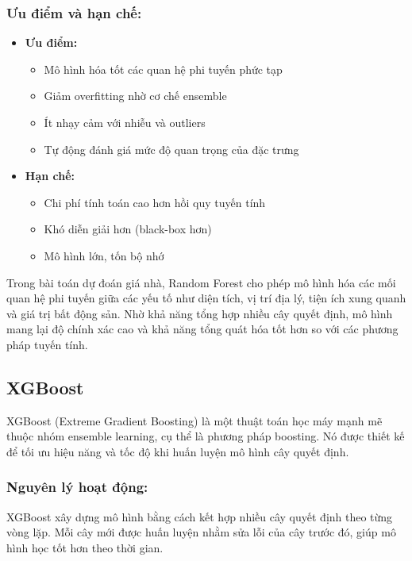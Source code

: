 \subsubsection*{Ưu điểm và hạn chế:}

\begin{itemize}
    \item \textbf{Ưu điểm:}
    \begin{itemize}
        \item Mô hình hóa tốt các quan hệ phi tuyến phức tạp
        \item Giảm overfitting nhờ cơ chế ensemble
        \item Ít nhạy cảm với nhiễu và outliers
        \item Tự động đánh giá mức độ quan trọng của đặc trưng
    \end{itemize}
    
    \item \textbf{Hạn chế:}
    \begin{itemize}
        \item Chi phí tính toán cao hơn hồi quy tuyến tính
        \item Khó diễn giải hơn (black-box hơn)
        \item Mô hình lớn, tốn bộ nhớ
    \end{itemize}
\end{itemize}

Trong bài toán dự đoán giá nhà, Random Forest cho phép mô hình hóa các mối quan hệ phi tuyến giữa các yếu tố như diện tích, vị trí địa lý, tiện ích xung quanh và giá trị bất động sản. Nhờ khả năng tổng hợp nhiều cây quyết định, mô hình mang lại độ chính xác cao và khả năng tổng quát hóa tốt hơn so với các phương pháp tuyến tính.


\subsection{XGBoost}
XGBoost (Extreme Gradient Boosting) là một thuật toán học máy mạnh mẽ thuộc nhóm ensemble learning, cụ thể là phương pháp boosting. Nó được thiết kế để tối ưu hiệu năng và tốc độ khi huấn luyện mô hình cây quyết định.
\subsubsection*{Nguyên lý hoạt động:}
XGBoost xây dựng mô hình bằng cách kết hợp nhiều cây quyết định theo từng vòng lặp. Mỗi cây mới được huấn luyện nhằm sửa lỗi của cây trước đó, giúp mô hình học tốt hơn theo thời gian.

